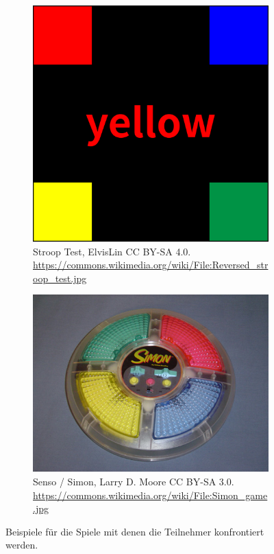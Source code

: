 \documentclass[a4paper, 11pt]{article}
\begin{document}
\begin{figure}
	\centering
	\begin{subfigure}{0.4\textwidth} %
		\includegraphics[width=\textwidth]{./figures/Reversed_stroop_test.jpg}
        \caption{Stroop Test, ElvisLin CC BY-SA 4.0. \url{https://commons.wikimedia.org/wiki/File:Reversed_stroop_test.jpg}} %
        \label{fig:stroop_test}
	\end{subfigure}
	\vspace{1em} %
	\begin{subfigure}{0.534\textwidth} %
		\includegraphics[width=\textwidth]{./figures/Simon_game.jpg}
		\caption{Senso / Simon, Larry D. Moore CC BY-SA 3.0. \url{https://commons.wikimedia.org/wiki/File:Simon_game.jpg}} %
        \label{fig:simon}
	\end{subfigure}
	\caption{Beispiele für die Spiele mit denen die Teilnehmer konfrontiert werden.} %
\end{figure}
\end{document}

